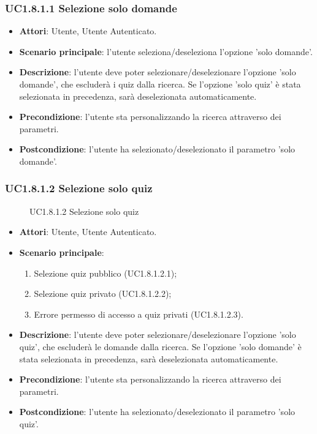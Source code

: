 \subsubsection{UC1.8.1.1 Selezione solo domande}
\begin{itemize}
\item \textbf{Attori}: Utente, Utente Autenticato.
\item \textbf{Scenario principale}: l'utente seleziona/deseleziona l'opzione 'solo domande'.
\item \textbf{Descrizione}: l'utente deve poter selezionare/deselezionare l'opzione 'solo domande', che escluderà i quiz dalla ricerca. Se l'opzione 'solo quiz' è stata selezionata in precedenza, sarà deselezionata automaticamente.
\item \textbf{Precondizione}: l'utente sta personalizzando la ricerca attraverso dei parametri.
\item \textbf{Postcondizione}: l'utente ha selezionato/deselezionato il parametro 'solo domande'.
\end{itemize}
\subsubsection{UC1.8.1.2 Selezione solo quiz}
\begin{figure}[H]
\centering
\noindent{}
\caption{UC1.8.1.2 Selezione solo quiz}
\end{figure}
\begin{itemize}
\item \textbf{Attori}: Utente, Utente Autenticato.
\item \textbf{Scenario principale}:
\begin{enumerate}
\item Selezione quiz pubblico (UC1.8.1.2.1);
\item Selezione quiz privato (UC1.8.1.2.2);
\item Errore permesso di accesso a quiz privati (UC1.8.1.2.3).
\end{enumerate}
\item \textbf{Descrizione}: l'utente deve poter selezionare/deselezionare l'opzione 'solo quiz', che escluderà le domande dalla ricerca. Se l'opzione 'solo domande' è stata selezionata in precedenza, sarà deselezionata automaticamente.
\item \textbf{Precondizione}: l'utente sta personalizzando la ricerca attraverso dei parametri.
\item \textbf{Postcondizione}: l'utente ha selezionato/deselezionato il parametro 'solo quiz'.
\end{itemize}
